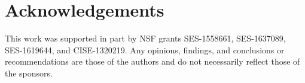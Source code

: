 \documentclass[10pt, conference, compsocconf]{IEEEtran}
\begin{document}
\section{Acknowledgements}

This work was supported in part by NSF grants SES-1558661, SES-1637089, SES-1619644, and CISE-1320219. Any opinions, findings, and conclusions or recommendations are those of the authors and do not necessarily reflect those of the sponsors.


%
%



%
%
\end{document}
